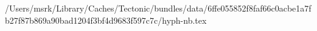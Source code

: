 /Users/msrk/Library/Caches/Tectonic/bundles/data/6ffe055852f8faf66c0acbe1a7fb27f87b869a90bad1204f3bf4d9683f597c7c/hyph-nb.tex